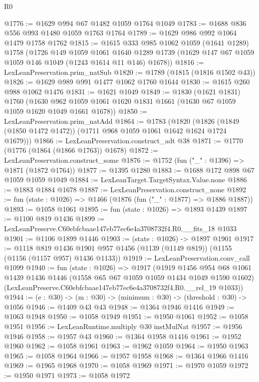 \begin{lexlean}{R0}
\begin{coremodule}
@1776 := @1629 @994 @67 @1482 @1059 @1764 @1049
@1783 := @1688 @836 @556 @993 @1480 @1059 @1763 @1764
@1789 := @1629 @986 @992 @1064 @1479 @1758 @1762
@1815 := @1615
    @333
    @985
    @1062
    @1059
    (@1641 @1289)
    @1758
    (@1726
      @149
      @1059
      @1061
      @1640
      @1289
      @1739
      (@1629 @147 @67 @1059 @1059 @146 @1049 (@1243 @1614 @11 @146) @1678))
@1816 := LexLeanPreservation.prim_natSub
@1820 := @1789 (@1815 (@1816 @1502 @43))
@1826 := @1629 @989 @991 @1477 @1062 @1760 @1644
@1830 := @1615 @260 @988 @1062 @1476
@1831 := @1621 @1049
@1849 := @1830
    (@1621 @1831)
    @1760
    (@1630 @962 @1059 @1061 @1620 @1831 @1661 (@1630 @67 @1059 @1059 @1620 @1049 @1661 @1678))
@1850 := LexLeanPreservation.prim_natAdd
@1864 := @1783
    (@1820 (@1826 (@1849 (@1850 @1472 @1472)) (@1711 @968 @1059 @1061 @1642 @1624 @1724 @1679)))
@1866 := LexLeanPreservation.construct_adt @38
@1871 := @1770 (@1776 (@1864 (@1866 @1763)) @1678)
@1872 := LexLeanPreservation.construct_some
@1876 := @1752 (fun ("_" : @1396) => @1871 (@1872 @1764))
@1877 := @1395 @1280
@1883 := @1688 @172 @898 @67 @1059 @1059 @1049
@1884 := LexLeanTarget.TargetSyntax.Value.none
@1886 := @1883 @1884 @1678
@1887 := LexLeanPreservation.construct_none
@1892 := fun (state : @1026) => @1466 (@1876 (fun ("_" : @1877) => @1886 @1887))
@1893 := @1058 @1061
@1895 := fun (state : @1026) => @1893 @1439
@1897 := @1100 @819 @1436
@1899 := LexLeanPreserve.C60ebfcbaae147eb77ec6e4a3708732f4.R0.__fits_18 @1033
@1901 := @1106 @1899 @1446
@1903 := (state : @1026) -> @1897 @1901
@1917 := @1118
    @819
    @1436
    @1901
    @957
    @1456
    (@1139 (@1149 @819))
    (@1155 (@1156 (@1157 @957) @1436 @1133))
@1919 := LexLeanPreservation.conv_call @1099
@1940 := fun (state : @1026) =>
  @1917
    (@1919
      @1456
      @954
      @68
      @1061
      @1439
      @1436
      @1446
      (@1558 @65 @67 @1059 @1059 @1434 @1049 @1590 @1602)
      (LexLeanPreserve.C60ebfcbaae147eb77ec6e4a3708732f4.R0.__rel_19 @1033))
@1944 := (e : @30) -> (m : @30) -> (minimum : @30) -> (threshold : @30) -> @1056
@1946 := @1409 @43 @43
@1948 := @1364 @1946 @1416
@1949 := @1063 @1948
@1950 := @1058 @1949
@1951 := @1950 @1061
@1952 := @1058 @1951
@1956 := LexLeanRuntime.multiply @30 instMulNat
@1957 := @1956 @1946
@1958 := @1957 @43
@1960 := @1364 @1958 @1416
@1961 := @1952 @1960
@1962 := @1058 @1961
@1963 := @1962 @1059
@1964 := @1950 @1963
@1965 := @1058 @1964
@1966 := @1957 @1958
@1968 := @1364 @1966 @1416
@1969 := @1965 @1968
@1970 := @1058 @1969
@1971 := @1970 @1059
@1972 := @1950 @1971
@1973 := @1058 @1972

\end{coremodule}
\end{lexlean}
